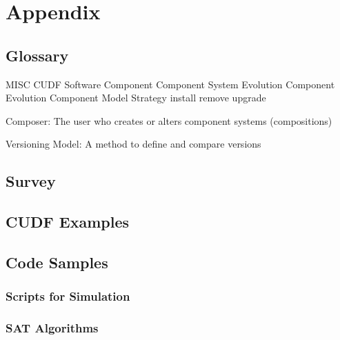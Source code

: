 \chapter{Appendix}

\section{Glossary}
MISC
CUDF
Software Component
Component System Evolution
Component Evolution
Component Model
Strategy
install
remove
upgrade

Composer: The user who creates or alters component systems (compositions)

Versioning Model: A method to define and compare versions

\section{Survey}
\label{apx.survey}

\section{CUDF Examples}

\section{Code Samples}
\subsection{Scripts for Simulation}
\subsection{SAT Algorithms}